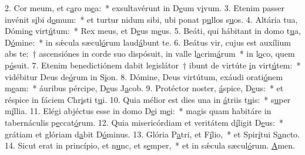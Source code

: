 2. Cor meum, et c\uline{a}ro m\uline{e}a:~* exsultavérunt in D\uline{e}um v\uline{i}vum.
3. Etenim passer invénit s\uline{i}bi d\uline{o}mum:~* et turtur nidum sibi, ubi ponat p\uline{u}llos s\uline{u}os.
4. Altária tua, Dómin\uline{e} virt\uline{ú}tum:~* Rex meus, et D\uline{e}us m\uline{e}us.
5. Beáti, qui hábitant in domo t\uline{u}a, D\uline{ó}mine:~* in sǽcula sæcul\uline{ó}rum laud\uline{á}bunt te.
6. Beátus vir, cujus est auxílium abs te:~† ascensiónes in corde suo dispósuit, in valle l\uline{a}crim\uline{á}rum~* in l\uline{o}co, quem p\uline{ó}suit.
7. Etenim benedictiónem dabit legislátor~† ibunt de virtúte \uline{i}n virt\uline{ú}tem:~* vidébitur Deus de\uline{ó}rum in S\uline{i}on.
8. Dómine, Deus virtútum, exáudi orati\uline{ó}nem m\uline{e}am:~* áuribus pércipe, D\uline{e}us J\uline{a}cob.
9. Protéctor noster, \uline{á}spice, D\uline{e}us:~* et réspice in fáciem Chr\uline{i}sti t\uline{u}i.
10. Quia mélior est dies una in \uline{á}triis t\uline{u}is:~* s\uline{u}per m\uline{í}llia.
11. Elégi abjéctus esse in domo D\uline{e}i m\uline{e}i:~* magis quam habitáre in tabernáculis p\uline{e}ccat\uline{ó}rum.
12. Quia misericórdiam et veritátem d\uline{í}ligit D\uline{e}us:~* grátiam et glóriam d\uline{a}bit D\uline{ó}minus.
13. Glória P\uline{a}tri, et F\uline{í}lio,~* et Spir\uline{í}tui S\uline{a}ncto.
14. Sicut erat in princípio, et n\uline{u}nc, et s\uline{e}mper,~* et in sǽcula sæcul\uline{ó}rum. \uline{A}men.
